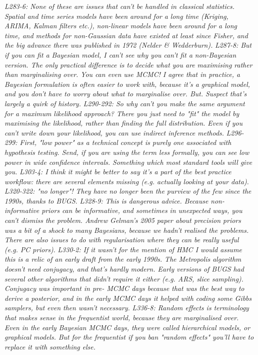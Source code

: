 \documentclass[11pt,a4paper]{article}
\begin{document}
\emph{L283-6: None of these are issues that can't be handled in classical statistics. Spatial and time series models have been around for a long time (Kriging, ARIMA,
Kalman filters etc.), non-linear models have been around for a long time, and methods for non-Gaussian data have existed at least since Fisher, and the big advance there was published in 1972 (Nelder \& Wedderburn).}
\emph{L287-8: But if you can fit a Bayesian model, I can't see why you can't fit a non-Bayesian version. The only practical difference is to decide what you are maximising rather than marginalising over. You can even use MCMC! I agree that in practice, a Bayesian formulation is often easier to work with, because it's a graphical model, and you don't have to worry about what to marginalise over. But. Suspect that's largely a quirk of history.}
\emph{L290-292: So why can't you make the same argument for a maximum likelihood approach? There you just need to "fit" the model by maximising the likelihood, rather than finding the full distribution. Even if you can't write down your likelihood, you can use indirect inference methods.}
\emph{L296-299: First, "low power" as a technical concept is purely one associated with hypothesis testing. Send, if you are using the term less formally, you can see low power in wide confidence intervals. Something which most standard tools will give you.}
\emph{L303-4: I think it might be better to say it's a part of the best practice workflow: there are several elements missing (e.g. actually looking at your data). L320-322: "no longer"! They have no longer been the purview of the few since the 1990s, thanks to BUGS.}
\emph{L328-9: This is dangerous advice. Because non-informative priors can be informative, and sometimes in unexpected ways, you can't dismiss the problem. Andrew Gelman's 2005 paper about precision priors was a bit of a shock to many Bayesians, because we hadn't realised the problems. There are also issues to do with regularisation where they can be really useful (e.g. PC priors).}
\emph{L330-2: If it wasn't for the mention of HMC I would assume this is a relic of an early draft from the early 1990s. The Metropolis algorithm doesn't need conjugacy, and that's hardly modern. Early versions of BUGS had several other algorithms that didn't require it either (e.g. ARS, slice sampling). Conjugacy was important in pre- MCMC days because that was the best way to derive a posterior, and in the early MCMC days it helped with coding some Gibbs samplers, but even then wasn't necessary.}
\emph{L336-8: Random effects is terminology that makes sense in the frequentist world, because they are marginalised over. Even in the early Bayesian MCMC days, they were called hierarchical models, or graphical models. But for the frequentist if you ban "random effects" you'll have to replace it with something else.}
\end{document}
